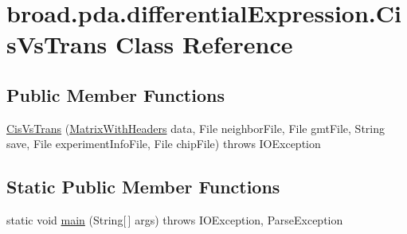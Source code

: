 \hypertarget{classbroad_1_1pda_1_1differential_expression_1_1_cis_vs_trans}{\section{broad.\+pda.\+differential\+Expression.\+Cis\+Vs\+Trans Class Reference}
\label{classbroad_1_1pda_1_1differential_expression_1_1_cis_vs_trans}
}
\subsection*{Public Member Functions}
\begin{DoxyCompactItemize}
\item 
\hyperlink{classbroad_1_1pda_1_1differential_expression_1_1_cis_vs_trans_a43583a09057da3787a0896aee63ec492}{Cis\+Vs\+Trans} (\hyperlink{classbroad_1_1core_1_1datastructures_1_1_matrix_with_headers}{Matrix\+With\+Headers} data, File neighbor\+File, File gmt\+File, String save, File experiment\+Info\+File, File chip\+File)  throws I\+O\+Exception
\end{DoxyCompactItemize}
\subsection*{Static Public Member Functions}
\begin{DoxyCompactItemize}
\item 
static void \hyperlink{classbroad_1_1pda_1_1differential_expression_1_1_cis_vs_trans_a15bca405efb1258899d23ff59fa94011}{main} (String\mbox{[}$\,$\mbox{]} args)  throws I\+O\+Exception, Parse\+Exception
\end{DoxyCompactItemize}


